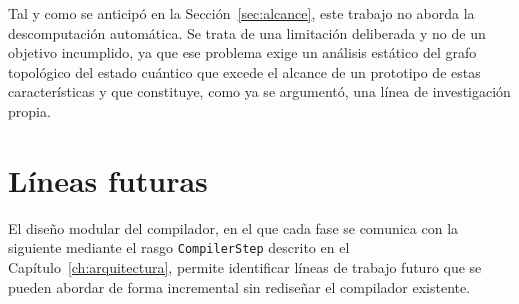 Tal y como se anticipó en la Sección~\ref{sec:alcance}, este trabajo no aborda la descomputación automática. Se trata de una limitación deliberada y no de un objetivo incumplido, ya que ese problema exige un análisis estático del grafo topológico del estado cuántico que excede el alcance de un prototipo de estas características y que constituye, como ya se argumentó, una línea de investigación propia.

\section{Líneas futuras}

El diseño modular del compilador, en el que cada fase se comunica con la siguiente mediante el rasgo \lstinline|CompilerStep| descrito en el Capítulo~\ref{ch:arquitectura}, permite identificar líneas de trabajo futuro que se pueden abordar de forma incremental sin rediseñar el compilador existente.

